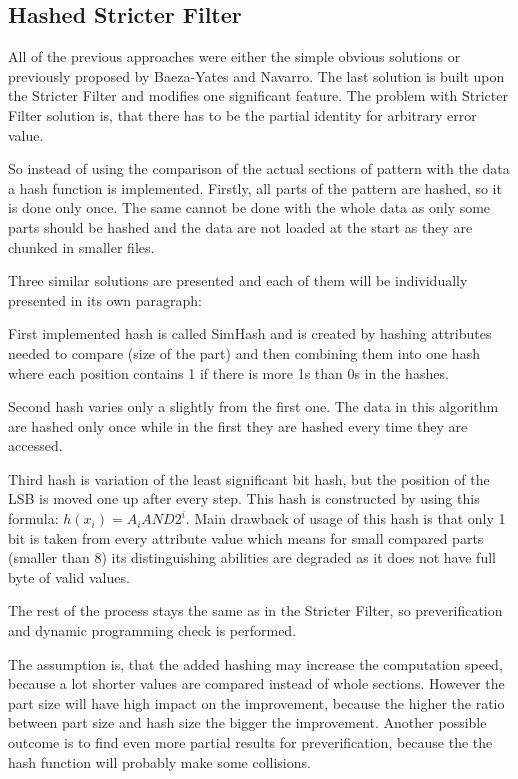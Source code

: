 \subsection{Hashed Stricter Filter }
All of the previous approaches were either the simple obvious solutions or previously proposed by Baeza-Yates and Navarro. The last solution is built upon the Stricter Filter and modifies one significant feature. The problem with Stricter Filter solution is, that there has to be the partial identity for arbitrary error value.

So instead of using the comparison of the actual sections of pattern with the data a hash function is implemented. Firstly, all parts of the pattern are hashed, so it is done only once. The same cannot be done with the whole data as only some parts should be hashed and the data are not loaded at the start as they are chunked in smaller files.

Three similar solutions are presented and each of them will be individually presented in its own paragraph:

First implemented hash is called SimHash and is created by hashing attributes needed to compare (size of the part) and then combining them into one hash where each position contains 1 if there is more 1s than 0s in the hashes. 

Second hash varies only a slightly from the first one. The data in this algorithm are hashed only once while in the first they are hashed every time they are accessed.

Third hash is variation of the least significant bit hash, but the position of the LSB is moved one up after every step. This hash is constructed by using this formula: $h(x_i) = A_i AND 2^i$. Main drawback of usage of this hash is that only 1 bit is taken from every attribute value which means for small compared parts (smaller than 8) its distinguishing abilities are degraded as it does not have full byte of valid values.

The rest of the process stays the same as in the Stricter Filter, so preverification and dynamic programming check is performed.

The assumption is, that the added hashing may increase the computation speed, because a lot shorter values are compared instead of whole sections. However the part size will have high impact on the improvement, because the higher the ratio between part size and hash size the bigger the improvement. Another possible outcome is to find even more partial results for preverification, because the the hash function will probably make some collisions.

